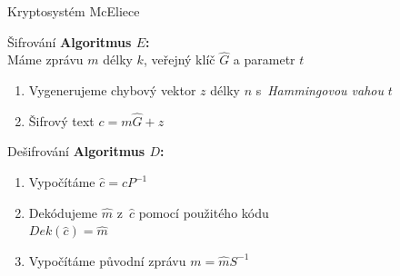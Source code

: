 \documentclass{beamer}
\begin{document}
\begin{frame}{Kryptosystém McEliece}

    \begin{block}{Šifrování}
        \textbf{Algoritmus $E$:} \\
        Máme zprávu $m$ délky $k$, veřejný klíč $\hat{G}$ a parametr $t$
        \begin{enumerate}
            \item Vygenerujeme chybový vektor $z$ délky $n$ s~\emph{Hammingovou
                vahou} $t$
            \item Šifrový text $c = m \hat{G} + z$
        \end{enumerate}
    \end{block}

\pause

    \begin{block}{Dešifrování}
        \textbf{Algoritmus $D$:}
        \begin{enumerate}
            \item Vypočítáme $\hat{c} = c P^{-1}$
            \item Dekódujeme $\hat{m}$ z~$\hat{c}$ pomocí použitého kódu \\
                $Dek(\hat{c}) = \hat{m}$
            \item Vypočítáme původní zprávu $m = \hat{m} S^{-1}$
        \end{enumerate}
    \end{block}

\end{frame}
\end{document}
